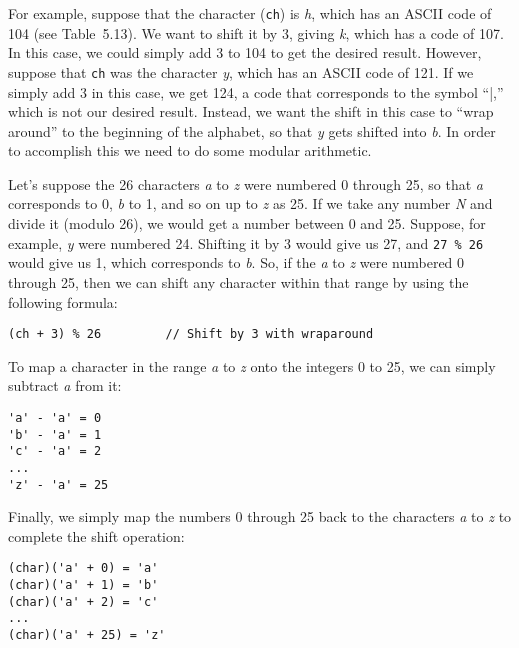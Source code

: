 For example, suppose that the character ({\tt ch}) is {\it h}, which has
an ASCII code of 104 (see Table~5.13). We want to shift it
by 3, giving {\it k}, which has a code of 107. In this case, we could
simply add 3 to 104 to get the desired result.  However, suppose
that {\tt ch} was the character {\it y}, which has an ASCII code of
121. If we simply add 3 in this case, we get 124, a code that
corresponds to the symbol ``|,'' which is not our desired result.
Instead, we want the shift in this case to ``wrap around'' to the
beginning of the alphabet, so that {\it y} gets shifted into {\it b}.
In order to accomplish this we need to do some modular arithmetic.

Let's suppose the 26 characters {\it a} to {\it z} were numbered 0 through 25,
so that {\it a} corresponds to 0, {\it b} to 1, and so on up to {\it z} as 25.  If
we take any number {\it N} and divide it (modulo 26), we would get a
number between 0 and 25. Suppose, for example, {\it y} were numbered
24. Shifting it by 3 would give us 27, and {\tt 27 \% 26} would
give us 1, which corresponds to {\it b}. So, if the {\it a} to {\it z} were
numbered 0 through 25, then we can shift any character within that
range by using the following formula:

\begin{jjjlisting}
\begin{lstlisting}
(ch + 3) % 26         // Shift by 3 with wraparound
\end{lstlisting}
\end{jjjlisting}

\noindent To map a character in the range {\it a} to {\it z} onto the
integers 0 to 25, we can simply subtract {\it a} from it:


\begin{jjjlisting}
\begin{lstlisting}
'a' - 'a' = 0
'b' - 'a' = 1
'c' - 'a' = 2
...
'z' - 'a' = 25
\end{lstlisting}
\end{jjjlisting}

\noindent Finally, we simply map the numbers 0 through 25 back to the
characters {\it a} to {\it z} to complete the shift operation:

\begin{jjjlisting}
\begin{lstlisting}
(char)('a' + 0) = 'a'
(char)('a' + 1) = 'b'
(char)('a' + 2) = 'c'
...
(char)('a' + 25) = 'z'
\end{lstlisting}
\end{jjjlisting}

